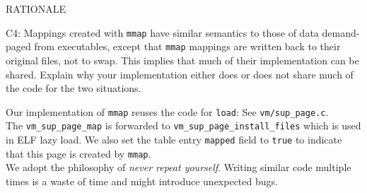 \begin{aspect}{RATIONALE}
	\begin{qc}
		C4: Mappings created with \lstinline{mmap} have similar semantics to those of data demand-paged from executables,
		except that \lstinline{mmap} mappings are written back to their original files, not to swap.
		This implies that much of their implementation can be shared.
		Explain why your implementation either does or does not share much of the code for the two situations.
	\end{qc}
	Our implementation of \lstinline{mmap} reuses the code for \lstinline{load}: See \lstinline{vm/sup_page.c}.\\
	The \lstinline{vm_sup_page_map} is forwarded to \lstinline{vm_sup_page_install_files} which is used in ELF lazy load.
	We also set the table entry \lstinline{mapped} field to \lstinline{true} to indicate that this page is created by \lstinline{mmap}.\\

	We adopt the philosophy of \emph{never repeat yourself}.
	Writing similar code multiple times is a waste of time and might introduce unexpected bugs.
\end{aspect}

